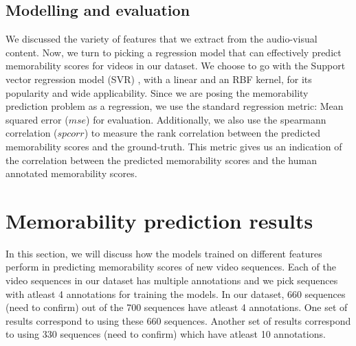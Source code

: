 \documentclass[sigconf]{acmart}
\begin{document}
\subsection{Modelling and evaluation}
\label{model-eval}
We discussed the variety of features that we extract from the audio-visual content.
Now, we turn to picking a regression model that can effectively predict memorability scores for videos in our dataset.
We choose to go with the Support vector regression model (SVR) \cite{svr}, with a linear and an RBF kernel, for its popularity and wide applicability.
Since we are posing the memorability prediction problem as a regression, we use the standard regression metric: Mean squared error ($mse$) for evaluation.
Additionally, we also use the spearmann correlation ($spcorr$) to measure the rank correlation between the predicted memorability scores and the ground-truth.
This metric gives us an indication of the correlation between the predicted memorability scores and the human annotated memorability scores.

\section{Memorability prediction results}
\label{pred-res}
In this section, we will discuss how the models trained on different features perform in predicting memorability scores of new video sequences.
Each of the video sequences in our dataset has multiple annotations and we pick sequences with atleast 4 annotations for training the models.
In our dataset, 660 sequences (need to confirm) out of the 700 sequences have atleast 4 annotations.
One set of results correspond to using these 660 sequences. 
Another set of results correspond to using 330 sequences (need to confirm) which have atleast 10 annotations. 
\end{document}
